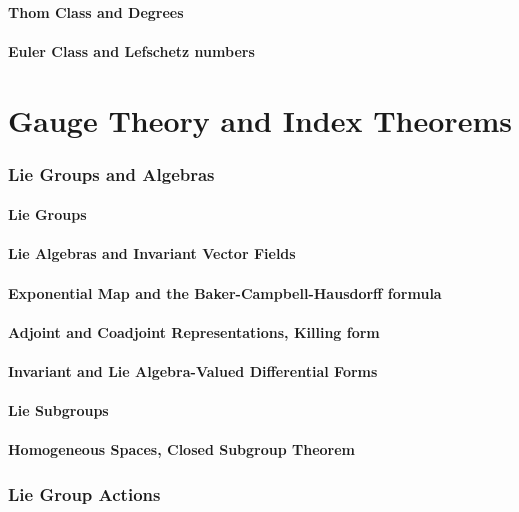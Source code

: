 \documentclass[english,letterpaper]{article}%
\numberwithin{equation}{section}
\numberwithin{figure}{section}
\numberwithin{table}{section}
\theoremstyle{definition}
\theoremstyle{definition}
\theoremstyle{definition}
\theoremstyle{plain}
\theoremstyle{plain}
\theoremstyle{plain}
\theoremstyle{plain}
\theoremstyle{remark}
\theoremstyle{remark}
\begin{document}
\subsection{Thom Class and Degrees}

\subsection{Euler Class and Lefschetz numbers}



\newpage
\part{Gauge Theory and Index Theorems}\label{Part III}

\section{Lie Groups and Algebras}
\subsection{Lie Groups}
\subsection{Lie Algebras and Invariant Vector Fields}
\subsection{Exponential Map and the Baker-Campbell-Hausdorff formula}
\subsection{Adjoint and Coadjoint Representations, Killing form}
\subsection{Invariant and Lie Algebra-Valued Differential Forms}
\subsection{Lie Subgroups}
\subsection{Homogeneous Spaces, Closed Subgroup Theorem}

\section{Lie Group Actions}
\end{document}
